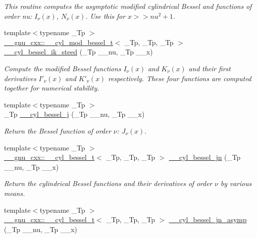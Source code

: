 \begin{DoxyCompactItemize}
\begin{DoxyCompactList}\small\item\em This routine computes the asymptotic modified cylindrical Bessel and functions of order nu\+: $ I_{\nu}(x) $, $ N_{\nu}(x) $. Use this for $ x >> nu^2 + 1 $. \end{DoxyCompactList}\item 
{\footnotesize template$<$typename \+\_\+\+Tp $>$ }\\\hyperlink{struct____gnu__cxx_1_1____cyl__mod__bessel__t}{\+\_\+\+\_\+gnu\+\_\+cxx\+::\+\_\+\+\_\+cyl\+\_\+mod\+\_\+bessel\+\_\+t}$<$ \+\_\+\+Tp, \+\_\+\+Tp, \+\_\+\+Tp $>$ \hyperlink{namespacestd_1_1____detail_a0995aa3ea71e25f413e73c07f6b47542}{\+\_\+\+\_\+cyl\+\_\+bessel\+\_\+ik\+\_\+steed} (\+\_\+\+Tp \+\_\+\+\_\+nu, \+\_\+\+Tp \+\_\+\+\_\+x)
\begin{DoxyCompactList}\small\item\em Compute the modified Bessel functions $ I_\nu(x) $ and $ K_\nu(x) $ and their first derivatives $ I'_\nu(x) $ and $ K'_\nu(x) $ respectively. These four functions are computed together for numerical stability. \end{DoxyCompactList}\item 
{\footnotesize template$<$typename \+\_\+\+Tp $>$ }\\\+\_\+\+Tp \hyperlink{namespacestd_1_1____detail_a9909fc0c463a7f0b9259fe02e15fce55}{\+\_\+\+\_\+cyl\+\_\+bessel\+\_\+j} (\+\_\+\+Tp \+\_\+\+\_\+nu, \+\_\+\+Tp \+\_\+\+\_\+x)
\begin{DoxyCompactList}\small\item\em Return the Bessel function of order $ \nu $\+: $ J_{\nu}(x) $. \end{DoxyCompactList}\item 
{\footnotesize template$<$typename \+\_\+\+Tp $>$ }\\\hyperlink{struct____gnu__cxx_1_1____cyl__bessel__t}{\+\_\+\+\_\+gnu\+\_\+cxx\+::\+\_\+\+\_\+cyl\+\_\+bessel\+\_\+t}$<$ \+\_\+\+Tp, \+\_\+\+Tp, \+\_\+\+Tp $>$ \hyperlink{namespacestd_1_1____detail_ae70ea3200a43241a3c6a73d3aa2dc1cc}{\+\_\+\+\_\+cyl\+\_\+bessel\+\_\+jn} (\+\_\+\+Tp \+\_\+\+\_\+nu, \+\_\+\+Tp \+\_\+\+\_\+x)
\begin{DoxyCompactList}\small\item\em Return the cylindrical Bessel functions and their derivatives of order $ \nu $ by various means. \end{DoxyCompactList}\item 
{\footnotesize template$<$typename \+\_\+\+Tp $>$ }\\\hyperlink{struct____gnu__cxx_1_1____cyl__bessel__t}{\+\_\+\+\_\+gnu\+\_\+cxx\+::\+\_\+\+\_\+cyl\+\_\+bessel\+\_\+t}$<$ \+\_\+\+Tp, \+\_\+\+Tp, \+\_\+\+Tp $>$ \hyperlink{namespacestd_1_1____detail_aeab3c6b4c96d8885871d2973b77e537f}{\+\_\+\+\_\+cyl\+\_\+bessel\+\_\+jn\+\_\+asymp} (\+\_\+\+Tp \+\_\+\+\_\+nu, \+\_\+\+Tp \+\_\+\+\_\+x)

\end{DoxyCompactItemize}
